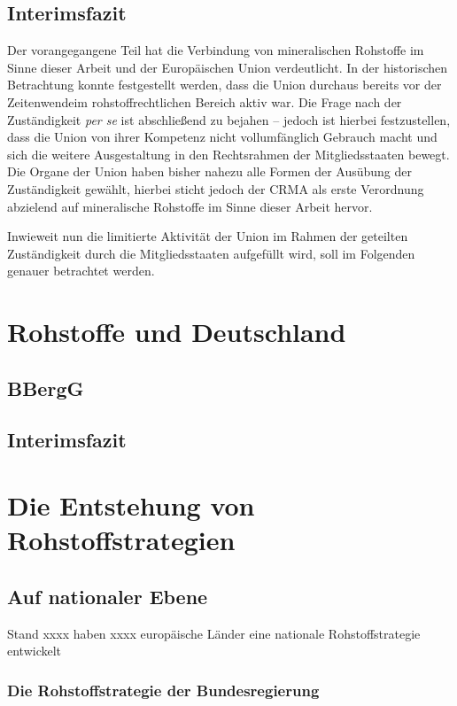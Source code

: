 \documentclass[12pt,a4paper,oneside]{book} %
\begin{document}
	\subsection{Interimsfazit}
	Der vorangegangene Teil hat die Verbindung von mineralischen Rohstoffe im Sinne dieser Arbeit und der Europäischen Union verdeutlicht. In der historischen Betrachtung konnte festgestellt werden, dass die Union durchaus bereits vor der \glqq Zeitenwende\grqq im rohstoffrechtlichen Bereich aktiv war.
	Die Frage nach der Zuständigkeit \textit{per se} ist abschließend zu bejahen -- jedoch ist hierbei festzustellen, dass die Union von ihrer Kompetenz nicht vollumfänglich Gebrauch macht und sich die weitere Ausgestaltung in den Rechtsrahmen der Mitgliedsstaaten bewegt.
	Die Organe der Union haben bisher nahezu alle Formen der Ausübung der Zuständigkeit gewählt, hierbei sticht jedoch der CRMA als erste Verordnung abzielend auf mineralische Rohstoffe im Sinne dieser Arbeit hervor.
	
	Inwieweit nun die limitierte Aktivität der Union im Rahmen der geteilten Zuständigkeit durch die Mitgliedsstaaten aufgefüllt wird, soll im Folgenden genauer betrachtet werden.
	
	\section{Rohstoffe und Deutschland}
	
	\subsection{BBergG}
	
	\subsection{Interimsfazit}
	
	\section{Die Entstehung von Rohstoffstrategien}
	
	\subsection{Auf nationaler Ebene}
	Stand xxxx haben xxxx europäische Länder eine nationale Rohstoffstrategie entwickelt
	
	\subsubsection{Die Rohstoffstrategie der Bundesregierung}
	
\end{document}

